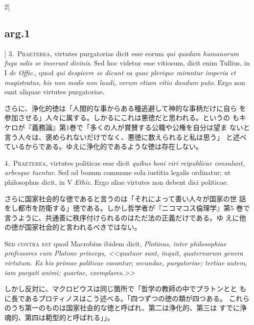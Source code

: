 \documentclass[paper=a4paper,fontsize=10pt,jafontsize=9pt,titlepage]{jlreq}
\begin{document}
\begin{paracol}{2}[\subsection{arg.1}]
3.~{\scshape Praeterea}, virtutes purgatorias dicit esse eorum
{\itshape qui quadam humanorum fuga solis se inserunt divinis}. Sed
hoc videtur esse vitiosum, dicit enim Tullius, in I {\itshape de
Offic}., quod {\itshape qui despicere se dicunt ea quae plerique
mirantur imperia et magistratus, his non modo non laudi, verum etiam
vitio dandum puto}. Ergo non sunt aliquae virtutes purgatoriae.

\switchcolumn

さらに、浄化的徳は「人間的な事からある種逃避して神的な事柄だけに自ら
 を参加させる」人々に属する。しかるにこれは悪徳だと思われる。というの
 もキケロが『義務論』第1巻で「多くの人が賞賛する公職や公権を自分は望ま
 ないと言う人々は、褒められないだけでなく、悪徳に数えられると私は思う」
 と述べているからである。ゆえに浄化的であるような徳は存在しない。


4.~{\scshape Praeterea}, virtutes politicas esse dicit {\itshape
quibus boni viri reipublicae consulunt, urbesque tuentur}. Sed ad
bonum commune sola iustitia legalis ordinatur; ut philosophus dicit,
in V {\itshape Ethic}. Ergo aliae virtutes non debent dici politicae.

\switchcolumn

さらに国家社会的な徳であると言うのは「それによって善い人々が国家の世
 話をし都市を防衛する」徳である。しかし哲学者が『ニコマコス倫理学』第5
 巻で言うように、共通善に秩序付けられるのはただ法の正義だけである。ゆ
 えに他の徳が国家社会的と言われるべきではない。

\switchcolumn*[\subsection{s.c.}]

{\scshape Sed contra est} quod Macrobius ibidem dicit, {\itshape
Plotinus, inter philosophiae professores cum Platone princeps, <<quatuor
sunt, inquit, quaternarum genera virtutum. Ex his primae politicae
vocantur; secundae, purgatoriae; tertiae autem, iam purgati animi;
quartae, exemplares.>>}

\switchcolumn

しかし反対に、マクロビウスは同じ箇所で「哲学の教師の中でプラトンとと
 もに長であるプロティノスはこう述べる。「四つずつの徳の類が四つある。
 これらのうち第一のものは国家社会的な徳と呼ばれ、第二は浄化的、第三は
 すでに浄魂的、第四は範型的と呼ばれる」」。


\end{paracol}
\end{document}
